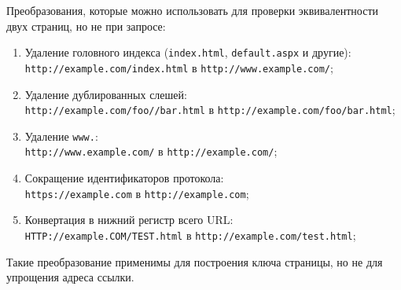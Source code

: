 Преобразования, которые можно использовать для проверки эквивалентности двух страниц, но не при запросе:
\begin{enumerate}
    \item Удаление головного индекса (\verb|index.html|, \verb|default.aspx| и другие): \\ \verb|http://example.com/index.html| в \verb|http://www.example.com/|;
    \item Удаление дублированных слешей: \\ \verb|http://example.com/foo//bar.html| в \verb|http://example.com/foo/bar.html|;
    \item Удаление \verb|www.|: \\ \verb|http://www.example.com/| в \verb|http://example.com/|;
    \item Сокращение идентификаторов протокола: \\ \verb|https://example.com| в \verb|http://example.com|;
    \item Конвертация в нижний регистр всего URL: \\ \verb|HTTP://example.COM/TEST.html| в \verb|http://example.com/test.html|;
\end{enumerate}

Такие преобразование применимы для построения ключа страницы, но не для упрощения адреса ссылки.
